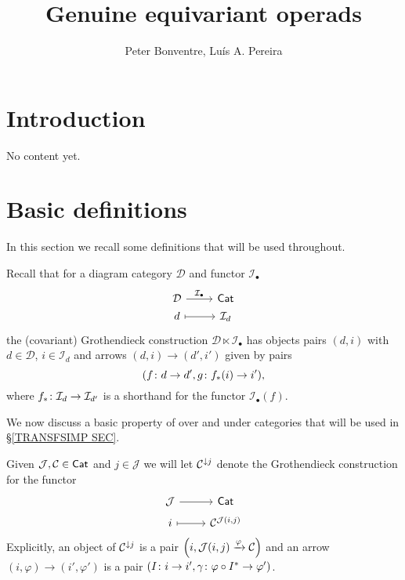 \documentclass[a4paper,10pt]{article}%
\author{Peter Bonventre, Lu\'is A. Pereira}%
\title{Genuine equivariant operads}%
\begin{document}
	\maketitle%



\tableofcontents

\section{Introduction}

No content yet.



\section{Basic definitions}

In this section we recall some definitions that will be used throughout.



Recall that for a diagram category $\mathcal{D}$ and functor $\mathcal{I}_{\bullet}$
\begin{equation}
\begin{tikzcd}[row sep = 0.2em]
	\mathcal{D} \ar{r}{\mathcal{I}_{\bullet}} & \mathsf{Cat} \\
	d \ar[mapsto]{r} & \mathcal{I}_d
\end{tikzcd}
\end{equation}
the (covariant) Grothendieck construction 
$\mathcal{D} \ltimes \mathcal{I}_{\bullet}$
has objects pairs $(d,i)$ with $d \in \mathcal{D}$,
 $i \in \mathcal{I}_d$ and 
arrows $(d,i) \to (d',i')$ given by pairs
\[(f\colon d \to d', g \colon f_{\**}(i) \to i'),\]
where $f_{\**}\colon \mathcal{I}_d \to \mathcal{I}_{d'}$ is a shorthand for the functor $\mathcal{I}_{\bullet}(f)$.


We now discuss a basic property of over and under categories that will be used in \S \ref{TRANSFSIMP SEC}.


Given $\mathcal{J},\mathcal{C} \in \mathsf{Cat}$ and $j \in \mathcal{J}$ we will let $\mathcal{C}^{ \downarrow j}$ denote the Grothendieck construction for the functor
\[
\begin{tikzcd}[row sep = 0.25em]
	\mathcal{J} \ar{r} & \mathsf{Cat} \\
	i \ar[mapsto]{r} & \C^{\mathcal{J}(i,j)}
\end{tikzcd}
\]
Explicitly, an object of $\mathcal{C}^{\downarrow j}$ is a pair
$\left(i,\mathcal{J}(i,j)\xrightarrow{\varphi} \mathcal{C}\right)$
and an arrow 
$(i,\varphi) \to (i',\varphi')$
is a pair
$(I \colon i \to i', 
\gamma \colon \varphi\circ I^{\**} \to \varphi')$.
\end{document}
